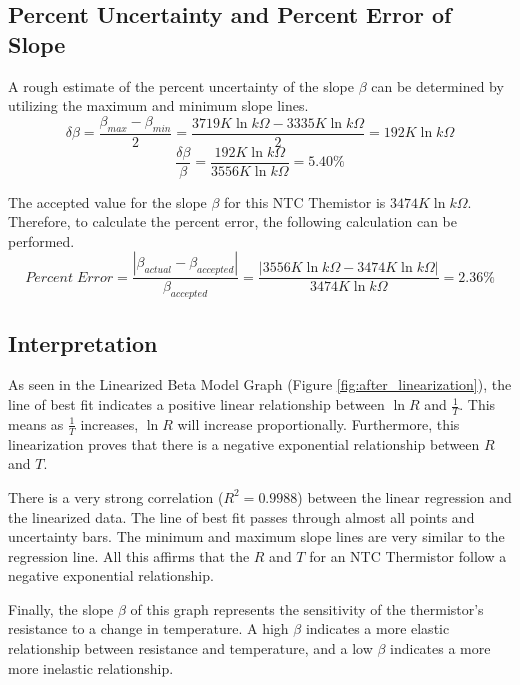 \subsection{Percent Uncertainty and Percent Error of Slope}
A rough estimate of the percent uncertainty of the slope $\beta$ can be determined by utilizing the maximum and minimum slope lines.
\[\delta \beta = \frac{\beta_{max}-\beta_{min}}{2} = \frac{3719 K \ln{k\Omega}-3335 K \ln{k\Omega}}{2}=192 K \ln{k\Omega}\]
\[\frac{\delta \beta}{\beta}=\frac{192 K \ln{k\Omega}}{3556 K \ln{k\Omega}}=5.40 \%\]

The accepted value for the slope $\beta$ for this NTC Themistor is $3474 K \ln{k\Omega}$.
Therefore, to calculate the percent error, the following calculation can be performed.
\[Percent \; Error = \frac{|\beta_{actual} - \beta_{accepted}|}{\beta_{accepted}}=\frac{|3556 K \ln{k\Omega} - 3474 K \ln{k\Omega}|}{3474 K \ln{k\Omega}}=2.36\%\]


\subsection{Interpretation}
As seen in the Linearized Beta Model Graph (Figure \ref{fig:after_linearization}), the line of best fit indicates a positive linear relationship between $\ln{R}$ and $\frac{1}{T}$. This means as $\frac{1}{T}$ increases, $\ln{R}$ will increase proportionally. Furthermore, this linearization proves that there is a negative exponential relationship between $R$ and $T$.

There is a very strong correlation ($R^2=0.9988$) between the linear regression and the linearized data. The line of best fit passes through almost all points and uncertainty bars. The minimum and maximum slope lines are very similar to the regression line. All this affirms that the $R$ and $T$ for an NTC Thermistor follow a negative exponential relationship.

Finally, the slope $\beta$ of this graph represents the sensitivity of the thermistor's resistance to a change in temperature. A high $\beta$ indicates a more elastic relationship between resistance and temperature, and a low $\beta$ indicates a more more inelastic relationship.